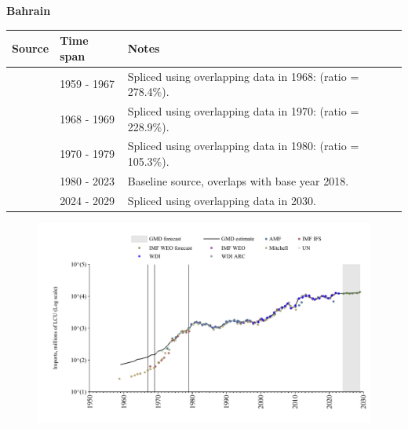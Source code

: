 \documentclass[12pt,a4paper,landscape]{article}
\begin{document}
\begin{adjustbox}{max totalsize={\paperwidth}{\paperheight},center}
\begin{minipage}[t][\textheight][t]{\textwidth}
\vspace*{0.5cm}
{}
\begin{center}
{\Large\bfseries Bahrain}
\end{center}
\vspace{0.5cm}
\begin{table}[H]
\centering
\small
\begin{tabular}{|l|l|l|}
\hline
\textbf{Source} & \textbf{Time span} & \textbf{Notes} \\
\hline
\rowcolor{white}\cite{Mitchell}& 1959 - 1967 &Spliced using overlapping data in 1968: (ratio = 278.4\%).\\
\rowcolor{lightgray}\cite{IMF_IFS}& 1968 - 1969 &Spliced using overlapping data in 1970: (ratio = 228.9\%).\\
\rowcolor{white}\cite{UN}& 1970 - 1979 &Spliced using overlapping data in 1980: (ratio = 105.3\%).\\
\rowcolor{lightgray}\cite{WDI}& 1980 - 2023 &Baseline source, overlaps with base year 2018.\\
\rowcolor{white}\cite{IMF_WEO_forecast}& 2024 - 2029 &Spliced using overlapping data in 2030.\\
\hline
\end{tabular}
\end{table}
\begin{figure}[H]
\centering
\includegraphics[width=\textwidth,height=0.6\textheight,keepaspectratio]{graphs/BHR_imports.pdf}
\end{figure}
\end{minipage}
\end{adjustbox}
\end{document}
